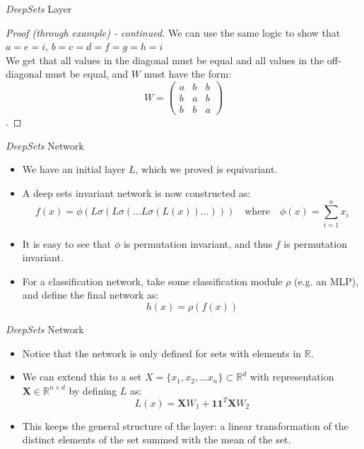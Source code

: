 \documentclass{beamer}
\begin{document}
\begin{frame}{\emph{DeepSets} Layer}
    \begin{proof}[Proof (through example) - continued]
        We can use the same logic to show that $a = e = i$, $b = c = d = f = g = h = i$\\
        We get that all values in the diagonal must be equal and all values in the off-diagonal must be equal, and $W$ must have the form:
        \[W = \begin{pmatrix}
            a & b & b\\
            b & a & b\\
            b & b & a
        \end{pmatrix}\].
    \end{proof}
\end{frame}
\begin{frame}{\emph{DeepSets} Network}
    \begin{itemize}
        \setlength{\itemsep}{\fill}
        \item We have an initial layer $L$, which we proved is equivariant.
        \item A deep sets invariant network is now constructed as:\\
        \[f(x) = \phi(L\sigma(L\sigma(\ldots L\sigma(L(x)) \ldots))) \quad \text{where} \quad \phi(x) = \sum_{i=1}^{n}x_i \]
        \item It is easy to see that $\phi$ is permutation invariant, and thus $f$ is permutation invariant.
        \item For a classification network, take some classification module $\rho$ (e.g. an MLP), and define the final network as:
        \[ h(x) = \rho(f(x)) \]  
    \end{itemize}
\end{frame}
\begin{frame}{\emph{DeepSets} Network}
    \begin{itemize}
        \setlength{\itemsep}{\fill}
        \item Notice that the network is only defined for sets with elements in $\mathbb{R}$.
        \item We can extend this to a set $X = \{x_1, x_2, \dots x_n\} \subset \mathbb{R}^d$ with representation $\textbf{X}\in\mathbb{R}^{n \times d}$ by defining $L$ as:
        \[L(x) = \mathbf{X}W_1 + \mathbf{1}\mathbf{1}^T\mathbf{X}W_2\]
        \item This keeps the general structure of the layer: a linear transformation of the distinct elements of the set summed with the mean of the set.  
    \end{itemize}
\end{frame}
\end{document}
